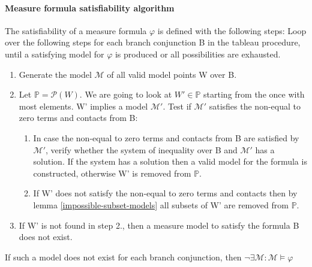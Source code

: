 \documentclass{article}
\newcommand{\vE}{\mathscr{v}}
\begin{document}
	\paragraph{Measure formula satisfiability algorithm} The satisfiability of a measure formula $\varphi$ is defined with the following steps:
\newline
\newline
	Loop over the following steps for each branch conjunction B in the tableau procedure, until a satisfying model for $\varphi$ is produced or all possibilities are exhausted.
	\begin{enumerate}
		\item Generate the model $\mathcal{M}$ of all valid model points W over B.
		\item Let $\mathbb{P} = \mathcal{P}(W)$. We are going to look at $W' \in \mathbb{P}$ starting from the once with most elements.
			W' implies a model $\mathcal{M'}$. 
			Test if $\mathcal{M'}$ satisfies the non-equal to zero terms and contacts from B:
		\begin{enumerate}
		\item In case the non-equal to zero terms and contacts from B are satisfied by $\mathcal{M'}$,
			verify whether the system of inequality over B and $\mathcal{M'}$ has a solution. 
			If the system has a solution then a valid model for the formula is constructed, otherwise W' is removed from $\mathbb{P}$.
		\item If W' does not satisfy the non-equal to zero terms and contacts  
			then by lemma \ref{impossible-subset-models} all subsets of W' are removed from $\mathbb{P}$.
		\end{enumerate}
		\item If W' is not found in step 2., then a measure model to satisfy the formula B does not exist.
	\end{enumerate}
	If such a model does not exist for each branch conjunction, then $\neg \exists \mathcal{M}: \mathcal{M} \models \varphi$ 
\end{document}
